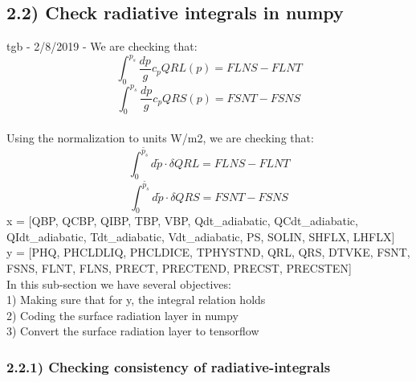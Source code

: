 \documentclass[11pt]{article}
\begin{document}
    \hypertarget{check-radiative-integrals-in-numpy}{%
\subsection{2.2) Check radiative integrals in
numpy}\label{check-radiative-integrals-in-numpy}}

tgb - 2/8/2019 - We are checking that: \[
\int_{0}^{p_{s}}\frac{dp}{g}c_{p}QRL\left(p\right)=FLNS-FLNT
\] \[
\int_{0}^{p_{s}}\frac{dp}{g}c_{p}QRS\left(p\right)=FSNT-FSNS
\]\\
Using the normalization to units W/m2, we are checking that:\\
\[
\int_{0}^{\widetilde{p_{s}}}d\widetilde{p}\cdot\delta QRL=FLNS-FLNT
\] \[
\int_{0}^{\widetilde{p_{s}}}d\widetilde{p}\cdot\delta QRS=FSNT-FSNS
\] x = {[}QBP, QCBP, QIBP, TBP, VBP, Qdt\_adiabatic, QCdt\_adiabatic,
QIdt\_adiabatic, Tdt\_adiabatic, Vdt\_adiabatic, PS, SOLIN, SHFLX,
LHFLX{]}\\
y = {[}PHQ, PHCLDLIQ, PHCLDICE, TPHYSTND, QRL, QRS, DTVKE, FSNT, FSNS,
FLNT, FLNS, PRECT, PRECTEND, PRECST, PRECSTEN{]}\\
In this sub-section we have several objectives:\\
1) Making sure that for y, the integral relation holds\\
2) Coding the surface radiation layer in numpy\\
3) Convert the surface radiation layer to tensorflow

    \hypertarget{checking-consistency-of-radiative-integrals}{%
\subsubsection{2.2.1) Checking consistency of
radiative-integrals}\label{checking-consistency-of-radiative-integrals}}
\end{document}
